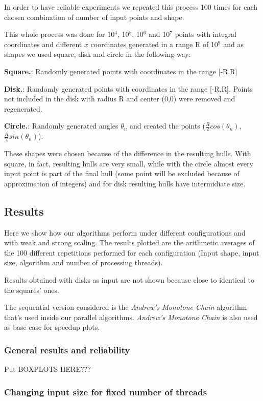 \documentclass[letterpaper]{article}
\newcommand{\mypar}[1]{{\bf #1.}}
\begin{document}
In order to have reliable experiments we repeated this process 100 times for each chosen combination of number of input points and shape.

This whole process was done for 10$^4$, 10$^5$, 10$^6$ and 10$^7$ points with integral coordinates and different $x$ coordinates generated in a range R of 10$^9$ and as shapes we used square, disk and circle in the following way:

\mypar{Square}: Randomly generated points with coordinates in the range [-R,R]

\mypar{Disk}: Randomly generated points with coordinates in the range [-R,R]. Points not included in the disk with radius R and center (0,0) were removed and regenerated.

\mypar{Circle}: Randomly generated angles $\theta_n$ and created the points ($\frac{R}{2}cos(\theta_n)$, $\frac{R}{2}sin(\theta_n)$).

These shapes were chosen because of the difference in the resulting hulls.
With square, in fact, resulting hulls are very small, while with the circle almost every input point is part of the final hull (some point will be excluded because of approximation of integers) and for disk resulting hulls have intermidiate size.

\subsection{Results}

Here we show how our algorithms perform under different configurations and with weak and strong scaling.
The results plotted are the arithmetic averages of the 100 different repetitions performed for each configuration (Input shape, input size, algorithm and number of processing threads).

Results obtained with disks as input are not shown because close to identical to the squares' ones.

The sequential version considered is the \textit{Andrew's Monotone Chain} algorithm that's used inside our parallel algorithms. \textit{Andrew's Monotone Chain} is also used as base case for speedup plots.

\subsubsection{General results and reliability}

Put BOXPLOTS HERE???

\subsubsection{Changing input size for fixed number of threads}
\end{document}
